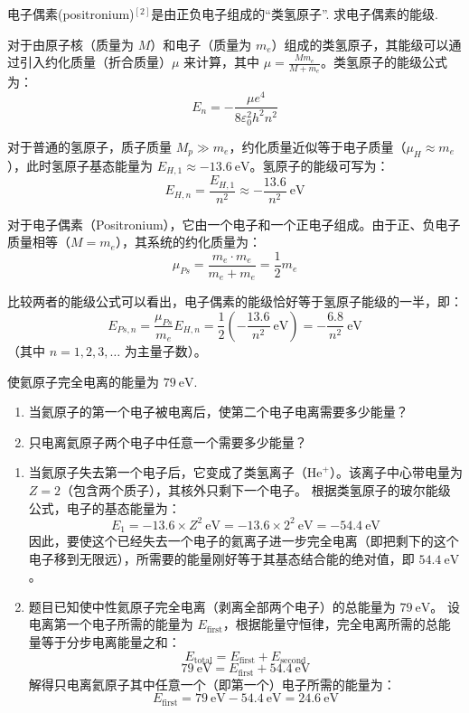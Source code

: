 \begin{exercise}\label{ex:25.2}
电子偶素(positronium)$^{[2]}$是由正负电子组成的“类氢原子”. 求电子偶素的能级.
\end{exercise}
\begin{solution}
对于由原子核（质量为 $M$）和电子（质量为 $m_e$）组成的类氢原子，其能级可以通过引入约化质量（折合质量）$\mu$ 来计算，其中 $\mu = \frac{M m_e}{M + m_e}$。类氢原子的能级公式为：
$$ E_n = - \frac{\mu e^4}{8 \varepsilon_0^2 h^2 n^2} $$

对于普通的氢原子，质子质量 $M_p \gg m_e$，约化质量近似等于电子质量（$\mu_H \approx m_e$），此时氢原子基态能量为 $E_{H,1} \approx -13.6 \ \mathrm{eV}$。氢原子的能级可写为：
$$ E_{H,n} = \frac{E_{H,1}}{n^2} \approx - \frac{13.6}{n^2} \ \mathrm{eV} $$

对于电子偶素（Positronium），它由一个电子和一个正电子组成。由于正、负电子质量相等（$M = m_e$），其系统的约化质量为：
$$ \mu_{Ps} = \frac{m_e \cdot m_e}{m_e + m_e} = \frac{1}{2} m_e $$

比较两者的能级公式可以看出，电子偶素的能级恰好等于氢原子能级的一半，即：
$$ E_{Ps,n} = \frac{\mu_{Ps}}{m_e} E_{H,n} = \frac{1}{2} \left( - \frac{13.6}{n^2} \ \mathrm{eV} \right) = - \frac{6.8}{n^2} \ \mathrm{eV} $$
（其中 $n = 1, 2, 3, \dots$ 为主量子数）。
\end{solution}

\begin{exercise}\label{ex:25.3}
使氦原子完全电离的能量为 $79 \ \mathrm{eV}$.
\begin{enumerate}
  \item[(a)] 当氦原子的第一个电子被电离后，使第二个电子电离需要多少能量？
  \item[(b)] 只电离氦原子两个电子中任意一个需要多少能量？
\end{enumerate}
\end{exercise}
\begin{solution}
\begin{enumerate}
    \item[(a)] 当氦原子失去第一个电子后，它变成了类氢离子（$\mathrm{He}^+$）。该离子中心带电量为 $Z=2$（包含两个质子），其核外只剩下一个电子。
    根据类氢原子的玻尔能级公式，电子的基态能量为：
    $$ E_1 = - 13.6 \times Z^2 \ \mathrm{eV} = - 13.6 \times 2^2 \ \mathrm{eV} = - 54.4 \ \mathrm{eV} $$
    因此，要使这个已经失去一个电子的氦离子进一步完全电离（即把剩下的这个电子移到无限远），所需要的能量刚好等于其基态结合能的绝对值，即 $54.4 \ \mathrm{eV}$。
    
    \item[(b)] 题目已知使中性氦原子完全电离（剥离全部两个电子）的总能量为 $79 \ \mathrm{eV}$。
    设电离第一个电子所需的能量为 $E_{\text{first}}$，根据能量守恒律，完全电离所需的总能量等于分步电离能量之和：
    $$ E_{\text{total}} = E_{\text{first}} + E_{\text{second}} $$
    $$ 79 \ \mathrm{eV} = E_{\text{first}} + 54.4 \ \mathrm{eV} $$
    解得只电离氦原子其中任意一个（即第一个）电子所需的能量为：
    $$ E_{\text{first}} = 79 \ \mathrm{eV} - 54.4 \ \mathrm{eV} = 24.6 \ \mathrm{eV} $$
\end{enumerate}
\end{solution}

